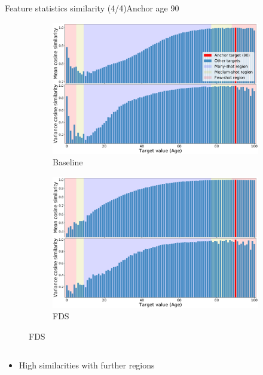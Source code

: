 \begin{frame}{Feature statistics similarity (4/4)}{Anchor age 90}
	\begin{figure}[h]
		\begin{subfigure}{0.48\textwidth}
			\includegraphics[width=\linewidth]{images/feat_sim_fds_base_90.pdf}
			\caption{Baseline}
		\end{subfigure}\hspace{1em}%
		\begin{subfigure}{0.48\textwidth}
			\includegraphics[width=\linewidth]{images/feat_sim_fds_ours_90.pdf}
			\caption{FDS}
		\end{subfigure}
	\end{figure}
	\vspace{-1em}
	\begin{columns}
		\footnotesize
		\begin{column}{0.5\textwidth}
			\begin{itemize}
				\item High similarities with further regions

\end{itemize}
\end{column}
\end{columns}
\end{frame}
